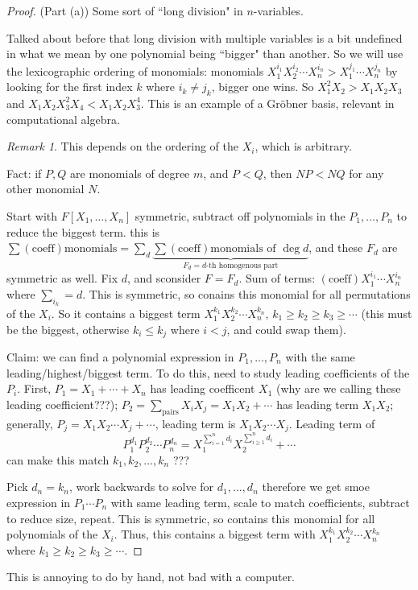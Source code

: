 \documentclass{article}
\theoremstyle{plain}
\theoremstyle{remark}
\newtheorem{remark}{Remark}
\begin{document}
\begin{proof}(Part (a))
	Some sort of ``long division" in $n$-variables.

	Talked about before that long division with multiple variables
	is a bit undefined in what we mean by one polynomial being
	``bigger" than another.
	So we will use the lexicographic ordering of monomials:
	monomials $X_1^{i_1}X_2^{i_2}\cdots X_n^{i_n} > X_1^{j_1}\cdots X_n^{j_n}$
	by looking for the first index $k$ where $i_k \neq j_k$, bigger one wins.
	So $X_1^2 X_2 > X_1X_2X_3$ and $X_1X_2X_3^2X_4 < X_1X_2X_3^4$.
	This is an example of a Gr\"{o}bner basis,
	relevant in computational algebra.
	\begin{remark}
		This depends on the ordering of the $X_i$, which is arbitrary.
	\end{remark}
	Fact: if $P,Q$ are monomials of degree $m$,
	and $P < Q$, then $NP < NQ$ for any other monomial $N$.

	Start with $F[X_1,\dots,X_n]$ symmetric,
	subtract off polynomials in the $P_1, \dots, P_n$ to reduce the biggest term.
	this is $\sum (\text{coeff})\text{monomials}
	= \sum_d \underbrace{\sum(\text{coeff})
	\text{monomials of }\deg{d}}_{F_d = d\text{-th homogenous part}}$,
	and these $F_d$ are symmetric as well.
	Fix $d$, and sconsider $F = F_d$.
	Sum of terms: $(\text{coeff})X_1^{i_1}\cdots X_n^{i_n}$ where $\sum_{i_k} = d$.
	This is symmetric, so conains this monomial for all permutations of the $X_i$.
	So it contains a biggest term $X_1^{k_1}X_2^{k_2}\cdots X_n^{k_n}$,
	$k_1 \geq k_2 \geq k_3 \geq \cdots$
	(this must be the biggest, otherwise $k_i \leq k_j$ where $i < j$,
	and could swap them).

	Claim: we can find a polynomial expression in $P_1,\dots,P_n$
	with the same leading/highest/biggest term.
	To do this, need to study leading coefficients of the $P_i$.
	First, $P_1 = X_1 + \cdots + X_n$ has leading coefficent $X_1$
	(why are we calling these leading coefficient???);
	$P_2 = \sum_{\text{pairs}} X_iX_j = X_1X_2 + \cdots$ has leading term $X_1X_2$;
	generally, $P_j = X_1X_2\cdots X_j + \cdots$, leading term is $X_1X_2\cdots X_j$.
	Leading term of
	\[
		P_1^{d_1}P_2^{d_2}\cdots P_n^{d_n} =
		X_1^{\sum_{i=1}^nd_i}X_2^{\sum_{i\geq1}^nd_i} + \cdots
	\]
	can make this match $k_1,k_2,\dots,k_n$ ???

	Pick $d_n = k_n$, work backwards to solve for $d_1,\dots,d_n$
	therefore we get smoe expression in $P_1\cdots P_n$ with same leading term,
	scale to match coefficients, subtract to reduce size, repeat.
	This is symmetric, so contains this monomial for all polynomials of the $X_i$.
	Thus, this contains a biggest term with $X_1^{k_1}X_2^{k_2}\cdots X_n^{k_n}$
	where $k_1 \geq k_2 \geq k_3 \geq \cdots$.
\end{proof}
This is annoying to do by hand, not bad with a computer.
\end{document}
